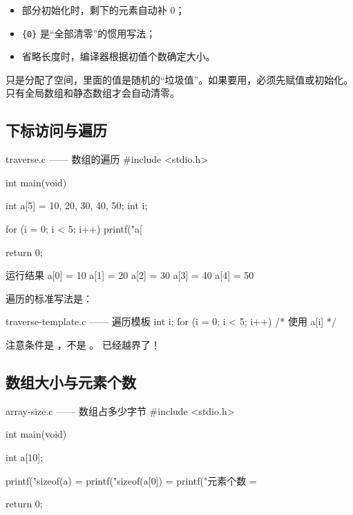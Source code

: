 \begin{itemize}
  \item 部分初始化时，剩下的元素自动补 0；
  \item \texttt{\{0\}} 是“全部清零”的惯用写法；
  \item 省略长度时，编译器根据初值个数确定大小。
\end{itemize}

\begin{pitfall}[局部数组不会自动清零]
 只是分配了空间，里面的值是随机的“垃圾值”。如果要用，必须先赋值或初始化。只有全局数组和静态数组才会自动清零。
\end{pitfall}

\subsection{下标访问与遍历}

\begin{codebox}{traverse.c —— 数组的遍历}
#include <stdio.h>

int main(void)
{
    int a[5] = {10, 20, 30, 40, 50};
    int i;

    for (i = 0; i < 5; i++) {
        printf("a[%
    }

    return 0;
}
\end{codebox}

\begin{outbox}{运行结果}
a[0] = 10
a[1] = 20
a[2] = 30
a[3] = 40
a[4] = 50
\end{outbox}

遍历的标准写法是：

\begin{codebox}{traverse-template.c —— 遍历模板}
int i;
for (i = 0; i < 5; i++) {
    /* 使用 a[i] */
}
\end{codebox}

注意条件是 ，不是 。 已经越界了！

\subsection{数组大小与元素个数}

\begin{codebox}{array-size.c —— 数组占多少字节}
#include <stdio.h>

int main(void)
{
    int a[10];

    printf("sizeof(a)    = %
    printf("sizeof(a[0]) = %
    printf("元素个数     = %

    return 0;
}
\end{codebox}

